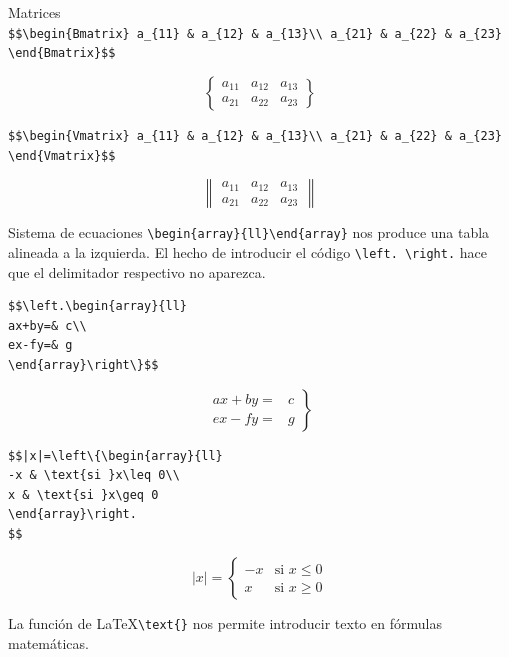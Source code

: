 \documentclass[
  ignorenonframetext,
]{beamer}
\begin{document}
\begin{frame}[fragile]{Matrices}
\label{matrices-2}
\texttt{\$\$\textbackslash{}begin\{Bmatrix\}\ a\_\{11\}\ \&\ a\_\{12\}\ \&\ a\_\{13\}\textbackslash{}\textbackslash{}\ a\_\{21\}\ \&\ a\_\{22\}\ \&\ a\_\{23\}\ \textbackslash{}end\{Bmatrix\}\$\$}

\[\begin{Bmatrix}
a_{11} & a_{12} & a_{13}\\
a_{21} & a_{22} & a_{23}
\end{Bmatrix}\]

\texttt{\$\$\textbackslash{}begin\{Vmatrix\}\ a\_\{11\}\ \&\ a\_\{12\}\ \&\ a\_\{13\}\textbackslash{}\textbackslash{}\ a\_\{21\}\ \&\ a\_\{22\}\ \&\ a\_\{23\}\ \textbackslash{}end\{Vmatrix\}\$\$}

\[\begin{Vmatrix}
a_{11} & a_{12} & a_{13}\\
a_{21} & a_{22} & a_{23}
\end{Vmatrix}\]
\end{frame}

\begin{frame}[fragile]{Sistema de ecuaciones}
\label{sistema-de-ecuaciones}
\texttt{\textbackslash{}begin\{array\}\{ll\}\textbackslash{}end\{array\}}
nos produce una tabla alineada a la izquierda. El hecho de introducir el
código \texttt{\textbackslash{}left.\ \textbackslash{}right.} hace que
el delimitador respectivo no aparezca.

\begin{verbatim}
$$\left.\begin{array}{ll}
ax+by=& c\\
ex-fy=& g
\end{array}\right\}$$
\end{verbatim}

\[\left.\begin{array}{ll}
ax+by=& c\\
ex-fy=& g
\end{array}\right\}\]

\begin{verbatim}
$$|x|=\left\{\begin{array}{ll}
-x & \text{si }x\leq 0\\
x & \text{si }x\geq 0
\end{array}\right.
$$
\end{verbatim}

\[|x|=\left\{\begin{array}{ll}
-x & \text{si }x\leq 0\\
x & \text{si }x\geq 0
\end{array}\right.\]

La función de \LaTeX \texttt{\textbackslash{}text\{\}} nos permite
introducir texto en fórmulas matemáticas.
\end{frame}
\end{document}
